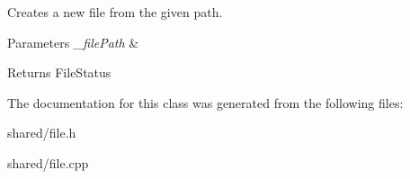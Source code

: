 Creates a new file from the given path. 


\begin{DoxyParams}{Parameters}
{\em \+\_\+file\+Path} & \\
\hline
\end{DoxyParams}
\begin{DoxyReturn}{Returns}
File\+Status 
\end{DoxyReturn}


The documentation for this class was generated from the following files\+:\begin{DoxyCompactItemize}
\item 
shared/file.\+h\item 
shared/file.\+cpp\end{DoxyCompactItemize}
